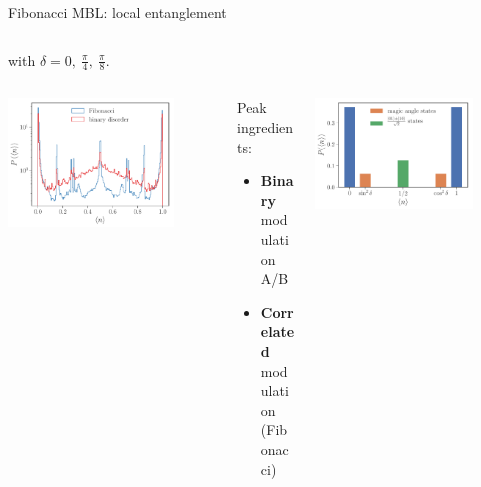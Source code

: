 \begin{frame}{Fibonacci MBL: local entanglement}
\begin{columns}
\begin{column}{0.5\textwidth}
with $\delta = 0,~\frac{\pi}{4},~\frac{\pi}{8}$.
\end{column}
\end{columns}
\begin{columns}
\begin{column}{0.33\textwidth}
\centering
\includegraphics[width=0.8\textwidth]{img/3_Fibonacci/local_observable_fibo_shuffle_p_8_h_5_L_22}
\end{column}
\begin{column}{0.33\textwidth}
Peak ingredients:
\begin{itemize}
	\item \textbf{Binary} modulation A/B
	\item \textbf{Correlated} modulation (Fibonacci)
\end{itemize}
\end{column}
\begin{column}{0.33\textwidth}
\centering
\includegraphics[width=0.8\textwidth]{img/3_Fibonacci/sz_perturbation_theory}
\end{column}
\end{columns}
\end{frame}

